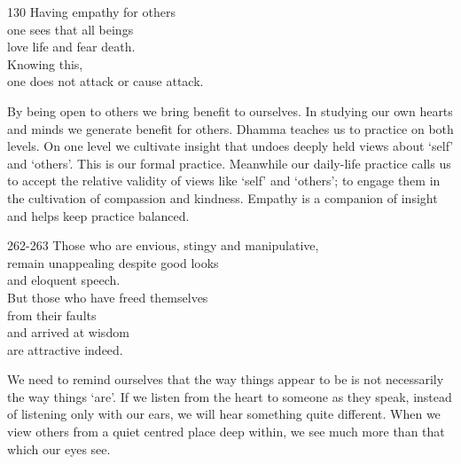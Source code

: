 
\begin{dhpVerse}{130}
\label{dhp-130}
Having empathy for others\\
one sees that all beings\\
love life and fear death.\\
Knowing this,\\
one does not attack or cause attack.
\end{dhpVerse}

\begin{dhpRefl}

By being open to others we bring benefit to ourselves. In studying
our own hearts and minds we generate benefit for others. Dhamma
teaches us to practice on both levels. On one level we cultivate
insight that undoes deeply held views about `self' and `others'. This
is our formal practice. Meanwhile our daily-life practice calls us to
accept the relative validity of views like `self' and `others'; to
engage them in the cultivation of compassion and kindness. Empathy is
a companion of insight and helps keep practice balanced.

\end{dhpRefl}


\begin{dhpVerse}{262-263}
\label{dhp-262}\label{dhp-263}
Those who are envious, stingy and manipulative,\\
remain unappealing despite good looks\\
and eloquent speech.\\
But those who have freed themselves\\
from their faults\\
and arrived at wisdom\\
are attractive indeed.
\end{dhpVerse}

\begin{dhpRefl}

We need to remind ourselves that the way things appear to be is not
necessarily the way things `are'. If we listen from the heart to
someone as they speak, instead of listening only with our ears, we
will hear something quite different. When we view others from a quiet
centred place deep within, we see much more than that which our eyes
see.

\end{dhpRefl}


